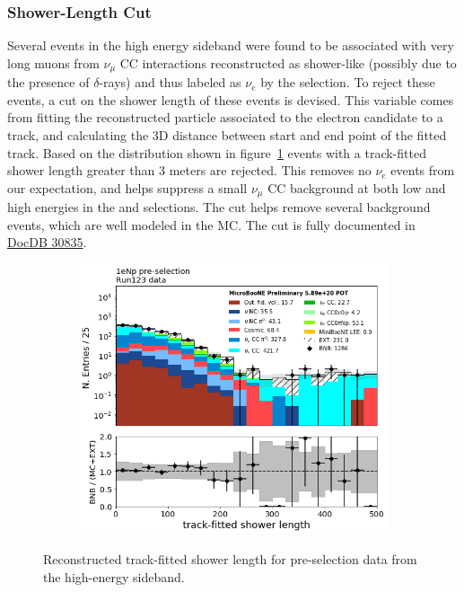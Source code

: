 \subsubsection{Shower-Length Cut}
\label{sec:sideband:newcuts:shrtrklen}
\par Several events in the high energy sideband were found to be associated with very long muons from $\nu_{\mu}$ CC interactions reconstructed as shower-like (possibly due to the presence of $\delta$-rays) and thus labeled as $\nu_e$ by the selection. To reject these events, a cut on the shower length of these events is devised. This variable comes from fitting the reconstructed particle associated to the electron candidate to a track, and calculating the 3D distance between start and end point of the fitted track. Based on the distribution shown in figure~\ref{fig:sb:cuts:shrlen} events with a track-fitted shower length greater than 3 meters are rejected. This removes no $\nu_e$ events from our expectation, and helps suppress a small $\nu_{\mu}$ CC background at both low and high energies in the \npsel and \zpsel selections. The cut helps remove several background events, which are well modeled in the MC. The cut is fully documented in \href{https://microboone-docdb.fnal.gov/cgi-bin/private/ShowDocument?docid=30835}{DocDB 30835}.

\begin{figure}[H]
    \begin{center}
    \begin{subfigure}{0.5\textwidth}
    \includegraphics[width=1.00\textwidth]{Sidebands/Figures/CutUpdates/1eNp_HE_shr_trk_len.png}
    \end{subfigure}
    \caption{\label{fig:sb:cuts:shrlen} Reconstructed track-fitted shower length for \npsel pre-selection data from the high-energy sideband.}
    \end{center}
\end{figure}

